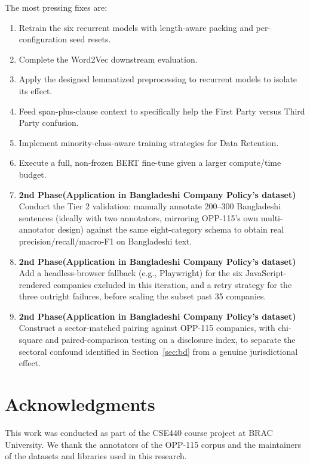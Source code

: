 \documentclass[11pt]{article}
\begin{document}
The most pressing fixes are:
\begin{enumerate}
\item Retrain the six recurrent models with length-aware packing and per-configuration seed resets.
\item Complete the Word2Vec downstream evaluation.
\item Apply the designed lemmatized preprocessing to recurrent models to isolate its effect.
\item Feed span-plus-clause context to specifically help the First Party versus Third Party confusion.
\item Implement minority-class-aware training strategies for Data Retention.
\item Execute a full, non-frozen BERT fine-tune given a larger compute/time budget.
\item \textbf{2nd Phase(Application in Bangladeshi Company Policy's dataset)} Conduct the Tier 2 validation: manually annotate 200--300 Bangladeshi sentences (ideally with two annotators, mirroring OPP-115's own multi-annotator design) against the same eight-category schema to obtain real precision/recall/macro-F1 on Bangladeshi text.
\item \textbf{2nd Phase(Application in Bangladeshi Company Policy's dataset)} Add a headless-browser fallback (e.g., Playwright) for the six JavaScript-rendered companies excluded in this iteration, and a retry strategy for the three outright failures, before scaling the subset past 35 companies.
\item \textbf{2nd Phase(Application in Bangladeshi Company Policy's dataset)} Construct a sector-matched pairing against OPP-115 companies, with chi-square and paired-comparison testing on a disclosure index, to separate the sectoral confound identified in Section~\ref{sec:bd} from a genuine jurisdictional effect.
\end{enumerate}

\section*{Acknowledgments}

This work was conducted as part of the CSE440 course project at BRAC University. We thank the annotators of the OPP-115 corpus and the maintainers of the datasets and libraries used in this research.



\end{document}
